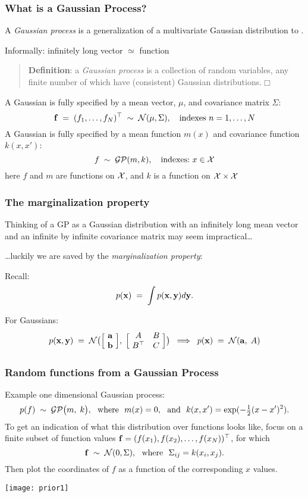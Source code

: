 \begin{frame}
\frametitle{What is a Gaussian Process?}

A \emph{Gaussian process} is a generalization of a multivariate Gaussian
distribution to .

Informally: infinitely long vector $\simeq$ function

\begin{quote}
{\bf Definition}: a \emph{Gaussian process} is a collection of random
variables, any finite number of which have (consistent) Gaussian
distributions.\hfill$\Box$
\end{quote}

A Gaussian  is fully specified by a mean vector, $\mu$, and
covariance matrix $\Sigma$:
\[
\mathbf f\;=\;(f_1,\ldots,f_N)^\top\;\sim\;{\cal N}(\mu,\Sigma),
\text{\ \ \ indexes\ } n=1,\ldots,N
\]
A Gaussian  is fully specified by a mean function $m(x)$ and
covariance function $k(x,x')$:
\[
f\;\sim\;{\cal GP}(m,k), \text{\ \ \ indexes:\ }x \in
{\cal X}
\]
here $f$ and $m$ are functions on ${\cal X}$, and $k$ is a function on
${\cal X} \times {\cal X}$
\end{frame}


\begin{frame}
\frametitle{The marginalization property}

Thinking of a GP as a Gaussian distribution with an infinitely long mean vector
and an infinite by infinite covariance matrix may seem impractical\ldots

\ldots luckily we are saved by the \emph{marginalization property}:

Recall:
\[
p(\mathbf x)\;=\;\int p(\mathbf x,\mathbf y)d\mathbf y.
\]

For Gaussians:
\[
p(\mathbf x,\mathbf y)\;=\;{\cal N}\big(\Big[\!\begin{array}{c}{\bf a} \\ {\bf b}
\end{array}\!\Big],
\;\Big[\!\begin{array}{cc}A & B \\ B^\top & C\end{array}\!\Big]\big)
\;\;\Longrightarrow\;\;p(\mathbf x)\;=\;{\cal N}({\bf a},\;A)
\]
\end{frame}


\begin{frame}
\frametitle{Random functions from a Gaussian Process}

Example one dimensional Gaussian process:
\[
p(f)\;\sim\;{\cal GP}\big(m,\;k\big),
\text{\ \ where\ \ }m(x) = 0,\text{\ \ and\ \ }k(x,x') = \exp(-\tfrac{1}{2}(x-x')^2).
\]
%
To get an indication of what this distribution over functions looks like, focus
on a finite subset of function values
$\mathbf f=(f(x_1),f(x_2),\ldots,f(x_N))^\top$, for which
\[
\mathbf f\;\sim\;{\cal N}(0, \Sigma),\text{\ \ where\ \ }\Sigma_{ij}=k(x_i,x_j).
\]
%
Then plot the coordinates of $f$ as a function of the corresponding $x$ values.
\centerline{\texttt{[image: prior1]}}
\end{frame}


